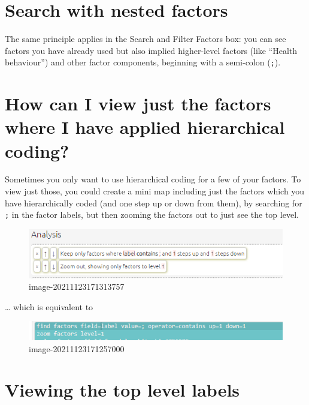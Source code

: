 \documentclass[
]{book}
\begin{document}
\hypertarget{search-with-nested-factors}{%
\section{Search with nested factors}\label{search-with-nested-factors}}

The same principle applies in the Search and Filter Factors box: you can see factors you have already used but also implied higher-level factors (like ``Health behaviour'') and other factor components, beginning with a semi-colon (\texttt{;}).

\hypertarget{how-can-i-view-just-the-factors-where-i-have-applied-hierarchical-coding}{%
\section{How can I view just the factors where I have applied hierarchical coding?}\label{how-can-i-view-just-the-factors-where-i-have-applied-hierarchical-coding}}

Sometimes you only want to use hierarchical coding for a few of your factors. To view just those, you could create a mini map including just the factors which you have hierarchically coded (and one step up or down from them), by searching for \texttt{;} in the factor labels, but then zooming the factors out to just see the top level.

\begin{figure}
\centering
\includegraphics{_assets/image-20211123171313757.png}
\caption{image-20211123171313757}
\end{figure}

\ldots{} which is equivalent to

\begin{figure}
\centering
\includegraphics{_assets/image-20211123171257000.png}
\caption{image-20211123171257000}
\end{figure}

\hypertarget{viewing-the-top-level-labels}{%
\section{Viewing the top level labels}\label{viewing-the-top-level-labels}}
\end{document}
